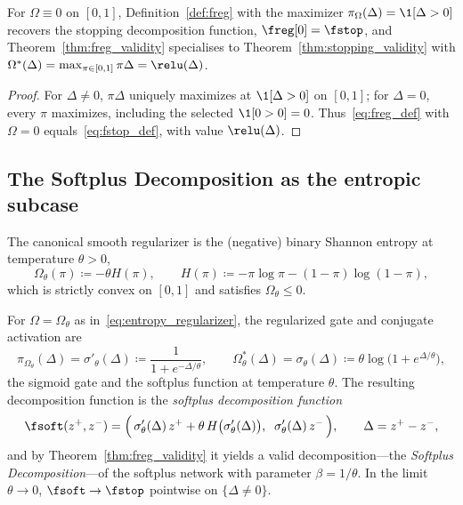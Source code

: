 \begin{corollary}\label{cor:freg_stop}
For $\Omega \equiv 0$ on $[0,1]$, Definition~\ref{def:freg} with the maximizer $\pi_\Omega(\Delta) = \1[\Delta > 0]$ recovers the stopping decomposition function, $\freg[0] = \fstop$, and Theorem~\ref{thm:freg_validity} specialises to Theorem~\ref{thm:stopping_validity} with $\Omega^*(\Delta) = \max_{\pi \in [0,1]} \pi\Delta = \relu(\Delta)$.\end{corollary}

\begin{proof}
For $\Delta\neq0$, $\pi\Delta$ uniquely maximizes at $\1[\Delta>0]$ on $[0,1]$; for $\Delta=0$, every $\pi$ maximizes, including the selected $\1[0>0]=0$. Thus~\eqref{eq:freg_def} with $\Omega=0$ equals~\eqref{eq:fstop_def}, with value $\relu(\Delta)$.
\end{proof}

\subsection{The Softplus Decomposition as the entropic subcase}\label{subsec:softplus_decomposition}

The canonical smooth regularizer is the (negative) binary Shannon entropy at temperature $\theta > 0$,
\begin{equation}
	\Omega_\theta(\pi) \coloneqq -\theta H(\pi),
	\qquad
	H(\pi) \coloneqq -\pi \log \pi - (1 - \pi) \log(1 - \pi),
	\label{eq:entropy_regularizer}
\end{equation}
which is strictly convex on $[0,1]$ and satisfies $\Omega_\theta \le 0$.

\begin{corollary}\label{cor:fsoft}
For $\Omega = \Omega_\theta$ as in~\eqref{eq:entropy_regularizer}, the regularized gate and conjugate activation are
\begin{equation}
	\pi_{\Omega_\theta}(\Delta) = \sigma'_\theta(\Delta) \coloneqq \frac{1}{1 + e^{-\Delta/\theta}},
	\qquad
	\Omega_\theta^*(\Delta) = \sigma_\theta(\Delta) \coloneqq \theta \log\bigl( 1 + e^{\Delta/\theta} \bigr),
	\label{eq:sigmoid_gate}
\end{equation}
the sigmoid gate and the softplus function at temperature $\theta$. The resulting decomposition function is the \emph{softplus decomposition function}
\begin{equation}
	\fsoft(z^+, z^-) = \Bigl(\, \sigma'_\theta(\Delta)\, z^+ + \theta\, H\bigl(\sigma'_\theta(\Delta)\bigr), \;\; \sigma'_\theta(\Delta)\, z^- \,\Bigr),
	\qquad
	\Delta = z^+ - z^-,
	\label{eq:fsoft_def}
\end{equation}
and by Theorem~\ref{thm:freg_validity} it yields a valid decomposition---the \emph{Softplus Decomposition}---of the softplus network with parameter $\beta = 1/\theta$. In the limit $\theta \to 0$, $\fsoft \to \fstop$ pointwise on $\{\Delta \neq 0\}$.\end{corollary}

